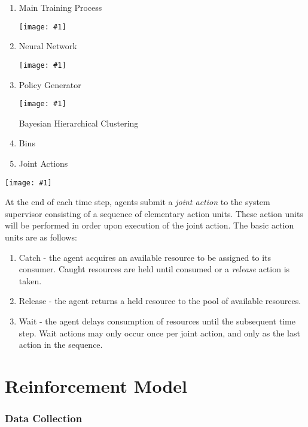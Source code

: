 \documentclass{article}
\theoremstyle{definition}
\theoremstyle{remark}
\newcommand{\addpic}[1]{\texttt{[image: \#1]}}
\begin{document}
	\begin{enumerate}[label=\alph*.]
	
	\item Main Training Process
	
	\addpic{figures/Training-Main-Process.jpg}
	
	\item Neural Network
	
	\addpic{figures/Neural-Network.jpeg}
	
	\item Policy Generator

	\addpic{figures/Policy-Generator.png}		
	
	Bayesian Hierarchical Clustering
	
	\item Bins
	
	\item Joint Actions

	\end{enumerate}

	\addpic{figures/Joint-action.jpg}

	
	
	At the end of each time step, agents submit a \emph{joint action} to the system supervisor consisting of a sequence of elementary action units. These action units will be performed in order upon execution of the joint action. The basic action units are as follows:
	
	\begin{enumerate}
		\item Catch - the agent acquires an available resource to be assigned to its consumer. Caught resources are held until consumed or a \emph{release} action is taken.
		\item Release - the agent returns a held resource to the pool of available resources.
		\item Wait - the agent delays consumption of resources until the subsequent time step. Wait actions may only occur once per joint action, and only as the last action in the sequence.
	\end{enumerate}

	
	\newpage
	
\part{Reinforcement Model}

	\section{Data Collection}
\end{document}
